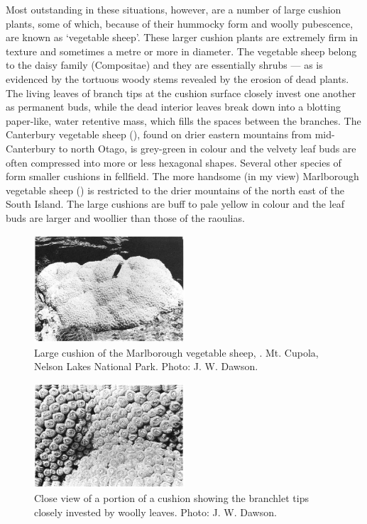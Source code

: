 Most outstanding in these situations, however, are a number of large cushion plants, some of which, because of their hummocky form and woolly pubescence, are known as `vegetable sheep'.
These larger cushion plants are extremely firm in texture and sometimes a metre or more in diameter.
The vegetable sheep belong to the daisy family (Compositae) and they are essentially shrubs — as is evidenced by the tortuous woody stems revealed by the erosion of dead plants.
The living leaves of branch tips at the cushion surface closely invest one another as permanent buds, while the dead interior leaves break down into a blotting paper-like, water retentive mass, which fills the spaces between the branches.
The Canterbury vegetable sheep (), found on drier eastern mountains from mid-Canterbury to north Otago, is grey-green in colour and the velvety leaf buds are often compressed into more or less hexagonal shapes.
Several other species of  form smaller cushions in fellfield.
The more handsome (in my view) Marlborough vegetable sheep () is restricted to the drier mountains of the north east of the South Island.
The large cushions are buff to pale yellow in colour and the leaf buds are larger and woollier than those of the raoulias.

\begin{figure}
	\includegraphics[width=0.5\textwidth]{graphics/figure108vegetable-sheep.jpg}
	\centering
	\caption[Large cushion of the Marlborough vegetable sheep]{Large cushion of the Marlborough vegetable sheep, .
    Mt. Cupola, Nelson Lakes National Park.
	Photo: J. W. Dawson.}
	\label{fig:108vegetable-sheep}
\end{figure}

\begin{figure}
	\includegraphics[width=0.5\textwidth]{graphics/figure109haastia.jpg}
	\centering
	\caption[Close view of a portion of a Haastia pulvinaris]{Close view of a portion of a  cushion showing the branchlet tips closely invested by woolly leaves.
	Photo: J. W. Dawson.}
	\label{fig:109haastia}
\end{figure}

